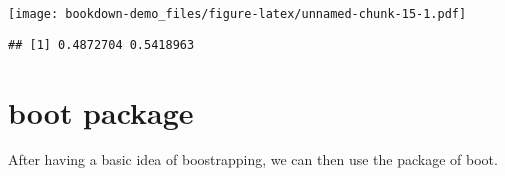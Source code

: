 \documentclass[]{book}
\begin{document}
\texttt{[image: bookdown-demo\_files/figure-latex/unnamed-chunk-15-1.pdf]}

\begin{verbatim}
## [1] 0.4872704 0.5418963
\end{verbatim}

\hypertarget{boot-package}{%
\section{boot package}\label{boot-package}}

After having a basic idea of boostrapping, we can then use the package of boot.


\end{document}
